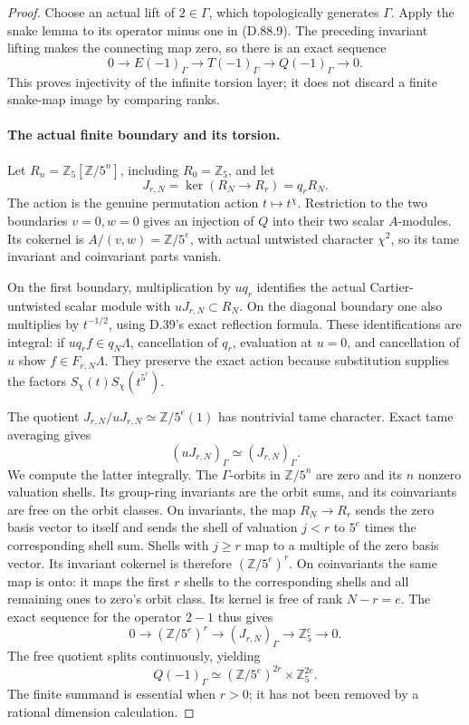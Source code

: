 \begin{proof}
Choose an actual lift of \(2\in\Gamma\), which topologically
generates \(\Gamma\). Apply the snake lemma to its operator
minus one in (D.88.9). The preceding invariant lifting makes
the connecting map zero, so there is an exact sequence
\[
 0\longrightarrow E(-1)_\Gamma\longrightarrow T(-1)_\Gamma
       \longrightarrow Q(-1)_\Gamma\longrightarrow0. \tag{D.88.13}
\]
This proves injectivity of the infinite torsion layer; it does
not discard a finite snake-map image by comparing ranks.

\paragraph{The actual finite boundary and its torsion.}
Let \(R_n=\mathbb Z_5[\mathbb Z/5^n]\), including
\(R_0=\mathbb Z_5\), and let
\[
       J_{r,N}=\ker(R_N\longrightarrow R_r)=q_rR_N.
\]
The action is the genuine permutation action
\(t\mapsto t^\chi\). Restriction to the two boundaries
\(v=0,w=0\) gives an injection of \(Q\) into their two
scalar \(A\)-modules. Its cokernel is
\(A/(v,w)=\mathbb Z/5^e\), with actual untwisted
character \(\chi^2\), so its tame invariant and coinvariant
parts vanish.

On the first boundary, multiplication by \(u q_r\)
identifies the actual Cartier-untwisted scalar module with
\(uJ_{r,N}\subset R_N\). On the diagonal boundary one
also multiplies by \(t^{-1/2}\), using D.39's exact
reflection formula. These identifications are integral:
if \(u q_r f\in q_N\Lambda\), cancellation of \(q_r\),
evaluation at \(u=0\), and cancellation of \(u\) show
\(f\in F_{r,N}\Lambda\). They preserve the exact action
because substitution supplies the factors
\(S_\chi(t)S_\chi(t^{5^r})\).

The quotient
\(J_{r,N}/uJ_{r,N}\simeq\mathbb Z/5^e(1)\)
has nontrivial tame character. Exact tame averaging gives
\[
       (uJ_{r,N})_\Gamma\simeq(J_{r,N})_\Gamma.        \tag{D.88.14}
\]
We compute the latter integrally. The \(\Gamma\)-orbits in
\(\mathbb Z/5^n\) are zero and its \(n\) nonzero valuation
shells. Its group-ring invariants are the orbit sums, and its
coinvariants are free on the orbit classes. On invariants,
the map \(R_N\to R_r\) sends the zero basis vector to
itself and sends the shell of valuation \(j<r\) to
\(5^e\) times the corresponding shell sum. Shells with
\(j\ge r\) map to a multiple of the zero basis vector.
Its invariant cokernel is therefore
\( (\mathbb Z/5^e)^r\).
On coinvariants the same map is onto: it maps the first
\(r\) shells to the corresponding shells and all remaining
ones to zero's orbit class. Its kernel is free of rank
\(N-r=e\). The exact sequence for the operator \(2-1\)
thus gives
\[
 0\longrightarrow(\mathbb Z/5^e)^r
   \longrightarrow(J_{r,N})_\Gamma
   \longrightarrow\mathbb Z_5^e\longrightarrow0.
\]
The free quotient splits continuously, yielding
\[
 Q(-1)_\Gamma\simeq
                (\mathbb Z/5^e)^{2r}\times\mathbb Z_5^{2e}.
                                                               \tag{D.88.15}
\]
The finite summand is essential when \(r>0\); it has not
been removed by a rational dimension calculation.


\end{proof}
